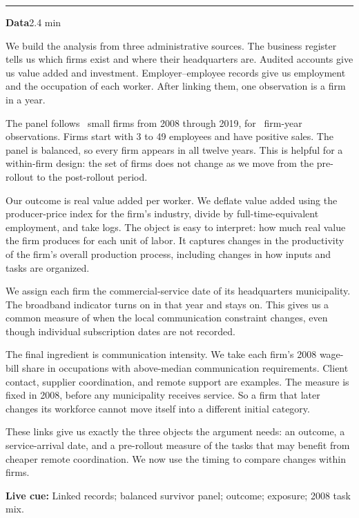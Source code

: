 \documentclass[11pt]{article}
\newcommand{\Cue}[1]{\par\nobreak\smallskip\noindent\textcolor{ScriptGray}{\footnotesize
  \textbf{Live cue:} #1}\par}
\newcommand{\scriptframe}[3]{%
  \Needspace{11\baselineskip}%
  \par\medskip\noindent\textcolor{ScriptBlue}{\rule{\linewidth}{0.55pt}}%
  \par\smallskip\noindent
  \textbf{#1}\hfill\textcolor{ScriptGray}{\small #2}\par\smallskip
  #3\par}
\begin{document}
\scriptframe{Data}{2.4 min}{%
  We build the analysis from three administrative sources. The business
  register tells us which firms exist and where their headquarters are. Audited
  accounts give us value added and investment. Employer--employee records give
  us employment and the occupation of each worker. After linking them, one
  observation is a firm in a year.

  The panel follows \ResFirms\ small firms from 2008 through 2019, for
  \ResFirmYears\ firm-year observations. Firms start with 3 to 49 employees and
  have positive sales. The panel is balanced, so every firm appears in all
  twelve years. This is helpful for a within-firm design: the set of firms does
  not change as we move from the pre-rollout to the post-rollout period.

  Our outcome is real value added per worker. We deflate value added using the
  producer-price index for the firm's industry, divide by full-time-equivalent
  employment, and take logs. The object is easy to interpret: how much real
  value the firm produces for each unit of labor. It captures changes in the
  productivity of the firm's overall production process, including changes in
  how inputs and tasks are organized.

  We assign each firm the commercial-service date of its headquarters
  municipality. The broadband indicator turns on in that year and stays on.
  This gives us a common measure of when the local communication constraint
  changes, even though individual subscription dates are not recorded.

  The final ingredient is communication intensity. We take each firm's 2008
  wage-bill share in occupations with above-median communication requirements.
  Client contact, supplier coordination, and remote support are examples. The
  measure is fixed in 2008, before any municipality receives service. So a firm
  that later changes its workforce cannot move itself into a different initial
  category.

  These links give us exactly the three objects the argument needs: an outcome,
  a service-arrival date, and a pre-rollout measure of the tasks that may benefit
  from cheaper remote coordination. We now use the timing to compare changes
  within firms.
  \Cue{Linked records; balanced survivor panel; outcome; exposure; 2008 task mix.}
}
\end{document}
